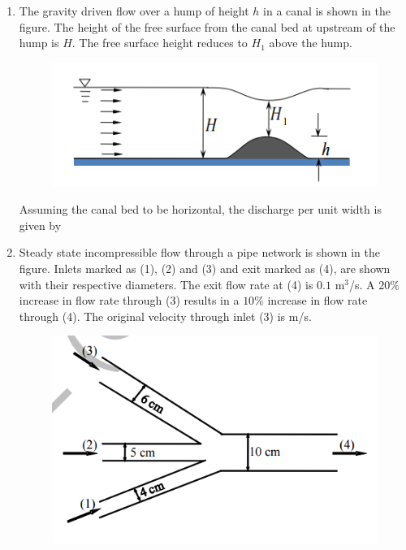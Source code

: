 \documentclass[a4paper,10pt]{article}
\begin{document}
\begin{enumerate}
    \item The gravity driven flow over a hump of height $h$ in a canal is shown in the figure. The height of the free surface from the canal bed at upstream of the hump is $H$. The free surface height reduces to $H_1$ above the hump.
    \begin{figure}[H] \centering \includegraphics[width=0.6\columnwidth]{Bq13.png} \caption*{} \label{fig:q13_fluid} \end{figure}
    Assuming the canal bed to be horizontal, the discharge per unit width is given by
    
    \hfill{}
    \begin{enumerate}
    \end{enumerate}

    \item Steady state incompressible flow through a pipe network is shown in the figure. Inlets marked as (1), (2) and (3) and exit marked as (4), are shown with their respective diameters. The exit flow rate at (4) is $0.1$ m$^3$/s. A $20\%$ increase in flow rate through (3) results in a $10\%$ increase in flow rate through (4). The original velocity through inlet (3) is \underline{\hspace{2cm}} m/s.
    \begin{figure}[H] \centering \includegraphics[width=0.6\columnwidth]{Bq14.png} \caption*{} \label{fig:q14_fluid} \end{figure}
    

\end{enumerate}
\end{document}
